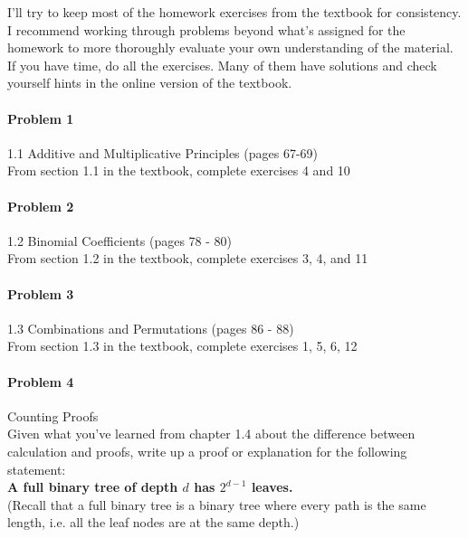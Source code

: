 \documentclass[11pt]{article} %
\begin{document}
	I'll try to keep most of the homework exercises from the textbook for consistency. I recommend working through problems beyond what's assigned for the homework to more thoroughly evaluate your own understanding of the material. If you have time, do all the exercises. Many of them have solutions and check yourself hints in the online version of the textbook.
	
	\paragraph{Problem 1} 1.1 Additive and Multiplicative Principles (pages 67-69)\\
	
	From section 1.1 in the textbook, complete exercises 4 and 10
	
	\paragraph{Problem 2} 1.2 Binomial Coefficients  (pages 78 - 80)\\
	
	From section 1.2 in the textbook, complete exercises 3, 4, and 11
	
	\paragraph{Problem 3} 1.3 Combinations and Permutations (pages 86 - 88)\\
	
	From section 1.3 in the textbook, complete exercises 1, 5, 6, 12
	
	\paragraph{Problem 4} Counting Proofs\\
	
	Given what you've learned from chapter 1.4 about the difference between calculation and proofs, write up a proof or explanation for the following statement:\\
	
	\textbf{A full binary tree of depth $d$ has $2^{d-1}$ leaves.} \\
	
	(Recall that a full binary tree is a binary tree where every path is the same length, i.e. all the leaf nodes are at the same depth.)
	
		
\end{document}
